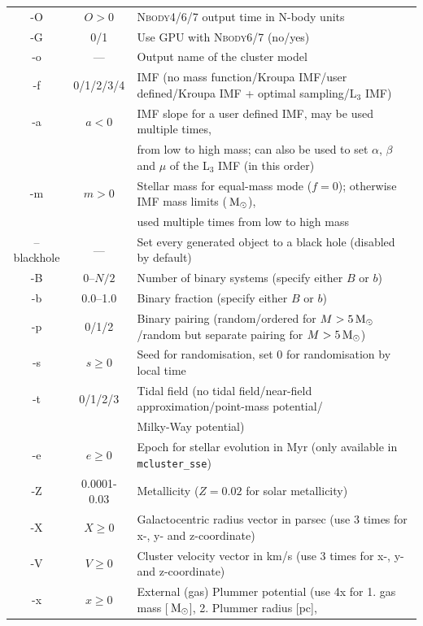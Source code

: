 \documentclass[useAMS,usenatbib]{mn2e}
\newcommand{\msun}{\mbox{$\,{\rm M}_\odot$}}
\begin{document}
\begin{table}
\begin{minipage}{\textwidth}
{\begin{tabular}{ccl}
      -O & $O>0$ & \textsc{Nbody4/6/7} output time in N-body units\\                           
      -G & 0/1 & Use GPU with \textsc{Nbody6/7} (no/yes)\\                   
      -o & --- & Output name of the cluster model\\                     
      -f & 0/1/2/3/4 & IMF (no mass function/Kroupa IMF/user defined/Kroupa IMF + optimal sampling/L$_3$ IMF)\\
      -a & $a<0$ & IMF slope for a user defined IMF, may be used multiple times,\\
      			&  &  from low to high mass; can also be used to set $\alpha$, $\beta$ and $\mu$ of the L$_3$ IMF (in this order)\\       
     -m & $m>0$ & Stellar mass for equal-mass mode ($f=0$); otherwise IMF mass limits ($\msun$), \\
			& & used multiple times from low to high mass\\
      --blackhole & --- & Set every generated object to a black hole (disabled by default)\\
      -B & 0--$N/2$ & Number of binary systems (specify either $B$ or $b$)\\                        
      -b & 0.0--1.0 & Binary fraction (specify either $B$ or $b$)\\           
      -p & 0/1/2 & Binary pairing (random/ordered for $M > 5 \msun$/random but separate pairing for  $M > 5 \msun$)\\  
      -s & $s\ge 0$& Seed for randomisation, set 0 for randomisation by local time\\   
      -t & 0/1/2/3 & Tidal field (no tidal field/near-field approximation/point-mass potential/\\
      			& & Milky-Way potential)\\           
      -e & $e\ge0$ & Epoch for stellar evolution in Myr (only available in \texttt{mcluster\_sse})\\                
      -Z & 0.0001-0.03 & Metallicity ($Z = 0.02$ for solar metallicity)\\          
      -X & $X\ge0$ & Galactocentric radius vector in parsec (use 3 times for x-, y- and z-coordinate)\\       
      -V & $V\ge0$ & Cluster velocity vector in km/s (use 3 times for x-, y- and z-coordinate)\\          
	-x & $x\ge0$ &  External (gas) Plummer potential (use 4x for 1. gas mass [$\msun$], 2. Plummer radius [pc],\\         

\end{tabular}}
\end{minipage}
\end{table}
\end{document}
